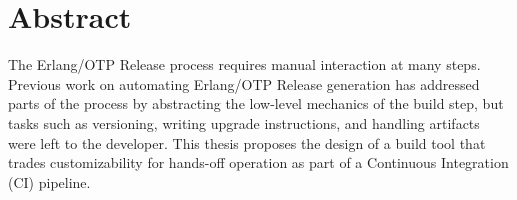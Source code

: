 \cleardoublepage{}

\section*{Abstract}

The Erlang/OTP Release process requires manual interaction at many steps. Previous work on automating Erlang/OTP Release generation has addressed parts of the process by abstracting the low-level mechanics of the build step, but tasks such as versioning, writing upgrade instructions, and handling artifacts were left to the developer. This thesis proposes  the design of a build tool that trades customizability for hands-off operation as part of a Continuous Integration (CI) pipeline.
